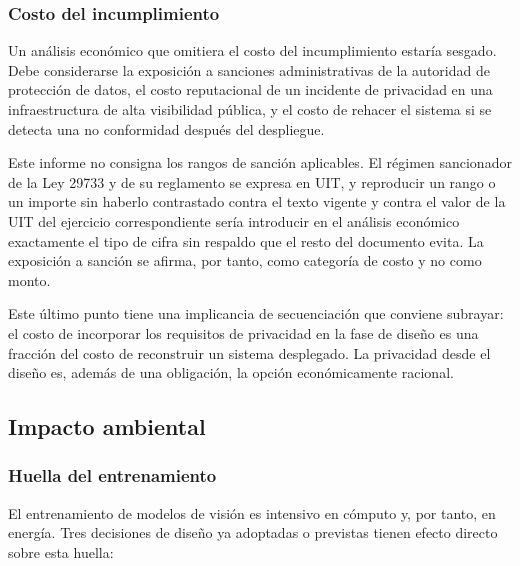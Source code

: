 \subsubsection{Costo del incumplimiento}

Un análisis económico que omitiera el costo del incumplimiento estaría
sesgado. Debe considerarse la exposición a sanciones administrativas de
la autoridad de protección de datos, el costo reputacional de un
incidente de privacidad en una infraestructura de alta visibilidad
pública, y el costo de rehacer el sistema si se detecta una no
conformidad después del despliegue.

Este informe no consigna los rangos de sanción aplicables. El régimen
sancionador de la Ley 29733 y de su reglamento se expresa en UIT, y
reproducir un rango o un importe sin haberlo contrastado contra el texto
vigente y contra el valor de la UIT del ejercicio correspondiente sería
introducir en el análisis económico exactamente el tipo de cifra sin
respaldo que el resto del documento evita. La exposición a sanción se
afirma, por tanto, como categoría de costo y no como monto.

Este último punto tiene una implicancia de secuenciación que conviene
subrayar: el costo de incorporar los requisitos de privacidad en la fase
de diseño es una fracción del costo de reconstruir un sistema desplegado.
La privacidad desde el diseño es, además de una obligación, la opción
económicamente racional.

\subsection{Impacto ambiental}
\label{sec:impacto-ambiental}


\subsubsection{Huella del entrenamiento}

El entrenamiento de modelos de visión es intensivo en cómputo y, por
tanto, en energía. Tres decisiones de diseño ya adoptadas o previstas
tienen efecto directo sobre esta huella:

